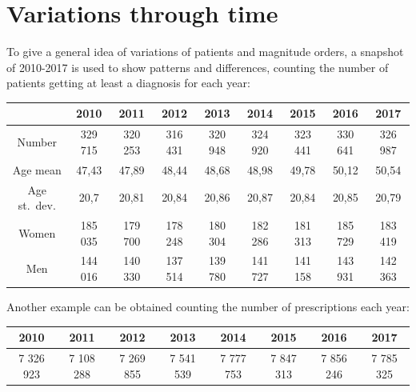 \section{Variations through time}
To give a general idea of variations of patients and magnitude orders, a snapshot of 2010-2017 is used to show patterns and differences, counting the number of patients getting at least a diagnosis for each year:
\begin{center}
	\small
	\begin{tabular}{c|c|c|c|c|c|c|c|c}
		  & 2010 & 2011 & 2012 & 2013 & 2014 & 2015 & 2016 & 2017 \\
		\hline
		Number & 329 715 & 320 253 & 316 431 & 320 948 & 324 920 & 323 441 & 330 641 & 326 987 \\
		\hline
		Age mean & 47,43 & 47,89 & 48,44 & 48,68 & 48,98 & 49,78 & 50,12 & 50,54 \\
		\hline
		Age st.\ dev. & 20,7 & 20,81 & 20,84 & 20,86 & 20,87 & 20,84 & 20,85 & 20,79 \\
		\hline
		Women & 185 035 & 179 700 & 178 248 & 180 304 & 182 286 & 181 313 & 185 729 & 183 419 \\
		\hline
		Men & 144 016 & 140 330 & 137 514 & 139 780 & 141 727 & 141 158 & 143 931 & 142 363 \\
	\end{tabular}
\end{center}
\bigskip
Another example can be obtained counting the number of prescriptions each year:
\begin{center}
	\small
	\begin{tabular}{c|c|c|c|c|c|c|c}
		2010 & 2011 & 2012 & 2013 & 2014 & 2015 & 2016 & 2017 \\
		\hline
		7 326 923 & 7 108 288 & 7 269 855 & 7 541 539 & 7 777 753 & 7 847 313 & 7 856 246 & 7 785 325 \\
	\end{tabular}
\end{center}


